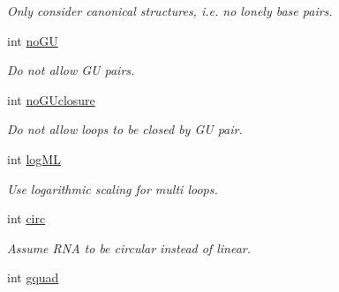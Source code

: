 \begin{DoxyCompactItemize}
\begin{DoxyCompactList}\small\item\em Only consider canonical structures, i.\+e. no \textquotesingle{}lonely\textquotesingle{} base pairs. \end{DoxyCompactList}\item 
int \hyperlink{group__model__details_ad64a5eaf9c4550e7525b36a725fec4b2}{no\+GU}\hypertarget{group__model__details_ad64a5eaf9c4550e7525b36a725fec4b2}{}\label{group__model__details_ad64a5eaf9c4550e7525b36a725fec4b2}

\begin{DoxyCompactList}\small\item\em Do not allow GU pairs. \end{DoxyCompactList}\item 
int \hyperlink{group__model__details_a7e883db1f33f8f3baa5c9b140350c78e}{no\+G\+Uclosure}\hypertarget{group__model__details_a7e883db1f33f8f3baa5c9b140350c78e}{}\label{group__model__details_a7e883db1f33f8f3baa5c9b140350c78e}

\begin{DoxyCompactList}\small\item\em Do not allow loops to be closed by GU pair. \end{DoxyCompactList}\item 
int \hyperlink{group__model__details_ae259f89a94acae0c7f1412603e7f57b5}{log\+ML}\hypertarget{group__model__details_ae259f89a94acae0c7f1412603e7f57b5}{}\label{group__model__details_ae259f89a94acae0c7f1412603e7f57b5}

\begin{DoxyCompactList}\small\item\em Use logarithmic scaling for multi loops. \end{DoxyCompactList}\item 
int \hyperlink{group__model__details_a92762e1008503d4623ff5c01e358a464}{circ}\hypertarget{group__model__details_a92762e1008503d4623ff5c01e358a464}{}\label{group__model__details_a92762e1008503d4623ff5c01e358a464}

\begin{DoxyCompactList}\small\item\em Assume R\+NA to be circular instead of linear. \end{DoxyCompactList}\item 
int \hyperlink{group__model__details_af88a511a2b1f526b4c6213de6cb8fd6e}{gquad}\hypertarget{group__model__details_af88a511a2b1f526b4c6213de6cb8fd6e}{}\label{group__model__details_af88a511a2b1f526b4c6213de6cb8fd6e}


\end{DoxyCompactItemize}
